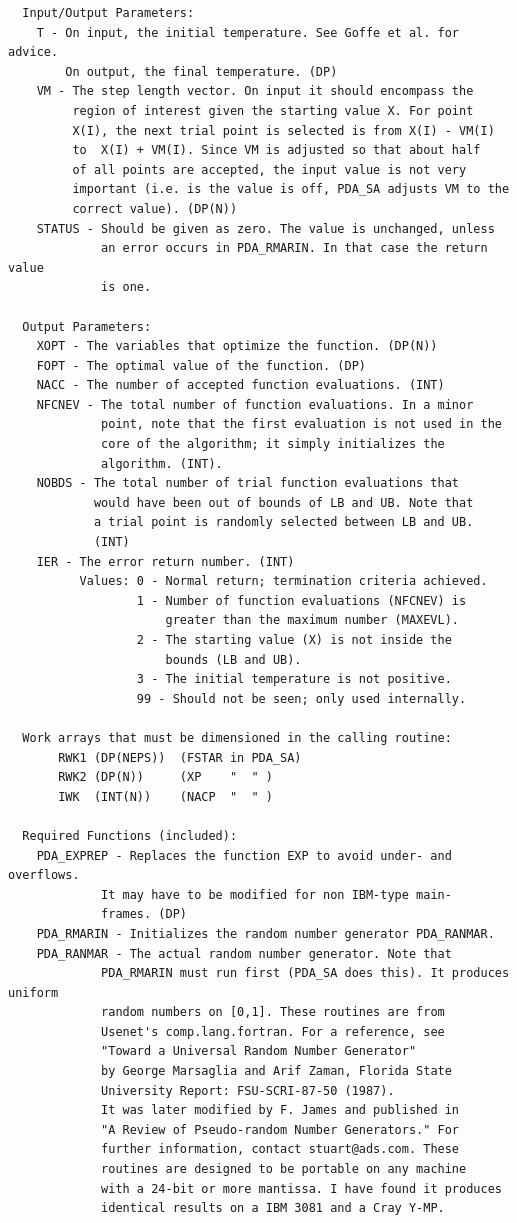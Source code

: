 \documentclass[11pt,twoside]{article}
\begin{document}
\begin{verbatim}
  Input/Output Parameters:
    T - On input, the initial temperature. See Goffe et al. for advice.
        On output, the final temperature. (DP)
    VM - The step length vector. On input it should encompass the
         region of interest given the starting value X. For point
         X(I), the next trial point is selected is from X(I) - VM(I)
         to  X(I) + VM(I). Since VM is adjusted so that about half
         of all points are accepted, the input value is not very
         important (i.e. is the value is off, PDA_SA adjusts VM to the
         correct value). (DP(N))
    STATUS - Should be given as zero. The value is unchanged, unless
             an error occurs in PDA_RMARIN. In that case the return value
             is one.

  Output Parameters:
    XOPT - The variables that optimize the function. (DP(N))
    FOPT - The optimal value of the function. (DP)
    NACC - The number of accepted function evaluations. (INT)
    NFCNEV - The total number of function evaluations. In a minor
             point, note that the first evaluation is not used in the
             core of the algorithm; it simply initializes the
             algorithm. (INT).
    NOBDS - The total number of trial function evaluations that
            would have been out of bounds of LB and UB. Note that
            a trial point is randomly selected between LB and UB.
            (INT)
    IER - The error return number. (INT)
          Values: 0 - Normal return; termination criteria achieved.
                  1 - Number of function evaluations (NFCNEV) is
                      greater than the maximum number (MAXEVL).
                  2 - The starting value (X) is not inside the
                      bounds (LB and UB).
                  3 - The initial temperature is not positive.
                  99 - Should not be seen; only used internally.

  Work arrays that must be dimensioned in the calling routine:
       RWK1 (DP(NEPS))  (FSTAR in PDA_SA)
       RWK2 (DP(N))     (XP    "  " )
       IWK  (INT(N))    (NACP  "  " )

  Required Functions (included):
    PDA_EXPREP - Replaces the function EXP to avoid under- and overflows.
             It may have to be modified for non IBM-type main-
             frames. (DP)
    PDA_RMARIN - Initializes the random number generator PDA_RANMAR.
    PDA_RANMAR - The actual random number generator. Note that
             PDA_RMARIN must run first (PDA_SA does this). It produces uniform
             random numbers on [0,1]. These routines are from
             Usenet's comp.lang.fortran. For a reference, see
             "Toward a Universal Random Number Generator"
             by George Marsaglia and Arif Zaman, Florida State
             University Report: FSU-SCRI-87-50 (1987).
             It was later modified by F. James and published in
             "A Review of Pseudo-random Number Generators." For
             further information, contact stuart@ads.com. These
             routines are designed to be portable on any machine
             with a 24-bit or more mantissa. I have found it produces
             identical results on a IBM 3081 and a Cray Y-MP.


\end{verbatim}
\end{document}
